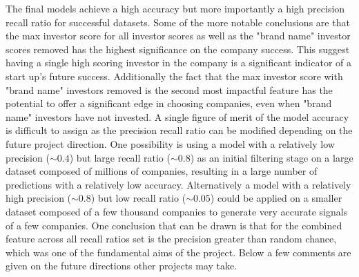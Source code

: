 \documentclass{article}
\begin{document}
The final models achieve a high accuracy but more importantly a high precision recall ratio for successful datasets. Some of the more notable conclusions are that the max investor score for all investor scores as well as the "brand name" investor scores removed has the highest significance on the company success. This suggest having a single high scoring investor in the company is a significant indicator of a start up's future success. Additionally the fact that the max investor score with "brand name" investors removed is the second most impactful feature has the potential to offer a significant edge in choosing companies, even when "brand name" investors have not invested. A single figure of merit of the model accuracy is difficult to assign as the precision recall ratio can be modified depending on the future project direction. One possibility is using a model with a relatively low precision ($\sim0.4$) but large recall ratio ($\sim0.8$) as an initial filtering stage on a large dataset composed of millions of companies, resulting in a large number of predictions with a relatively low accuracy. Alternatively a model with a relatively high precision ($\sim0.8$) but low recall ratio ($\sim0.05$) could be applied on a smaller dataset composed of a few thousand companies to generate very accurate signals of a few companies. One conclusion that can be drawn is that for the combined feature across all recall ratios set is the precision greater than random chance, which was one of the fundamental aims of the project. Below a few comments are given on the future directions other projects may take. 
\end{document}
